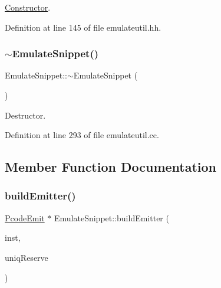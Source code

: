 \mbox{\hyperlink{class_constructor}{Constructor}}. 



Definition at line 145 of file emulateutil.\+hh.

\mbox{\label{class_emulate_snippet_af333890e0d9a94efbd3557070a829a44}} 
\subsubsection{\texorpdfstring{$\sim$EmulateSnippet()}{~EmulateSnippet()}}
{\footnotesize\ttfamily Emulate\+Snippet\+::$\sim$\+Emulate\+Snippet (\begin{DoxyParamCaption}\item[{void}]{ }\end{DoxyParamCaption})\hspace{0.3cm}{\ttfamily [virtual]}}



Destructor. 



Definition at line 293 of file emulateutil.\+cc.



\subsection{Member Function Documentation}
\mbox{\label{class_emulate_snippet_ad45023c5e4a7170496ef8acc48835d32}} 
\subsubsection{\texorpdfstring{buildEmitter()}{buildEmitter()}}
{\footnotesize\ttfamily \mbox{\hyperlink{class_pcode_emit}{Pcode\+Emit}} $\ast$ Emulate\+Snippet\+::build\+Emitter (\begin{DoxyParamCaption}\item[{const vector$<$ \mbox{\hyperlink{class_op_behavior}{Op\+Behavior}} $\ast$ $>$ \&}]{inst,  }\item[{\mbox{\hyperlink{types_8h_a2db313c5d32a12b01d26ac9b3bca178f}{uintb}}}]{uniq\+Reserve }\end{DoxyParamCaption})}



